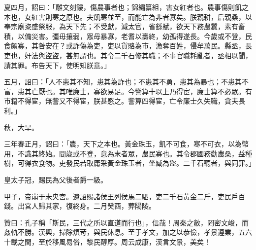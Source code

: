 \begin{pinyinscope}
夏四月，詔曰：「雕文刻鏤，傷農事者也；錦繡纂組，害女紅者也。農事傷則飢之本也，女紅害則寒之原也。夫飢寒並至，而能亡為非者寡矣。朕親耕，后親桑，以奉宗廟粢盛祭服，為天下先；不受獻，減太官，省繇賦，欲天下務農蠶，素有畜積，以備災害。彊毋攘弱，眾毋暴寡，老耆以壽終，幼孤得遂長。今歲或不登，民食頗寡，其咎安在？或詐偽為吏，吏以貨賂為市，漁奪百姓，侵牟萬民。縣丞，長吏也，奸法與盜盜，甚無謂也。其令二千石修其職；不事官職耗亂者，丞相以聞，請其罪。布告天下，使明知朕意。」

五月，詔曰：「人不患其不知，患其為詐也；不患其不勇，患其為暴也；不患其不富，患其亡厭也。其唯廉士，寡欲易足。今訾算十以上乃得宦，廉士算不必眾。有市籍不得宦，無訾又不得宦，朕甚愍之。訾算四得宦，亡令廉士久失職，貪夫長利。」

秋，大旱。

三年春正月，詔曰：「農，天下之本也。黃金珠玉，飢不可食，寒不可衣，以為幣用，不識其終始。間歲或不登，意為末者眾，農民寡也。其令郡國務勸農桑，益種樹，可得衣食物。吏發民若取庸采黃金珠玉者，坐臧為盜。二千石聽者，與同罪。」

皇太子冠，賜民為父後者爵一級。

甲子，帝崩于未央宮。遺詔賜諸侯王列侯馬二駟，吏二千石黃金二斤，吏民戶百錢。出宮人歸其家，復終身。二月癸酉，葬陽陵。

贊曰：孔子稱「斯民，三代之所以直道而行也」，信哉！周秦之敝，罔密文峻，而姦軌不勝。漢興，掃除煩苛，與民休息。至于孝文，加之以恭儉，孝景遵業，五六十載之間，至於移風易俗，黎民醇厚。周云成康，漢言文景，美矣！


\end{pinyinscope}
